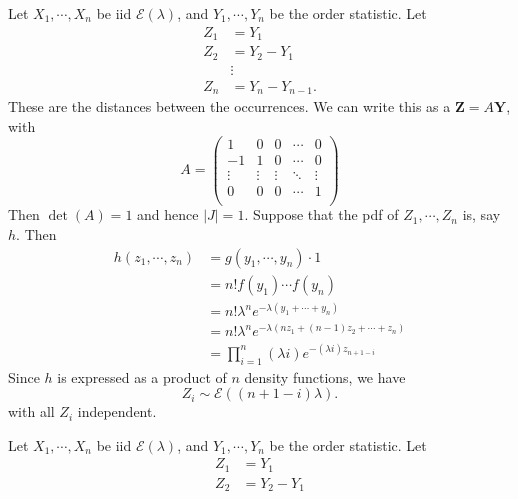 \begin{note}
  \begin{field}
    \begin{eg}
      Let $X_1, \cdots, X_n$ be iid $\mathcal{E}(\lambda)$, and $Y_1, \cdots, Y_n$ be the order statistic. Let
      \begin{align*}
        Z_1 &= Y_1\\
        Z_2 &= Y_2 - Y_1\\
        &\vdots\\
        Z_n &= Y_n - Y_{n - 1}.
      \end{align*}
      These are the distances between the occurrences. We can write this as a $\mathbf{Z} = A\mathbf{Y}$, with
      \[
        A =
        \begin{pmatrix}
          1 & 0 & 0 & \cdots& 0\\
          -1 & 1 & 0 & \cdots & 0\\
          \vdots & \vdots & \vdots & \ddots & \vdots\\
          0 & 0 & 0 & \cdots & 1\\
        \end{pmatrix}
      \]
      Then $\det (A) = 1$ and hence $|J| = 1$. Suppose that the pdf of $Z_1, \cdots, Z_n$ is, say $h$. Then
      \begin{align*}
        h(z_1, \cdots, z_n) &= g(y_1, \cdots, y_n)\cdot 1\\
        &= n!f(y_1) \cdots f(y_n)\\
        &= n!\lambda^n e^{-\lambda (y_1 + \cdots + y_n)}\\
        &= n!\lambda^n e^{-\lambda (nz_1 + (n - 1)z_2 + \cdots + z_n)}\\
        &= \prod_{i = 1}^n (\lambda i)e^{-(\lambda i)z_{n + 1 - i}}
      \end{align*}
      Since $h$ is expressed as a product of $n$ density functions, we have
      \[
        Z_i \sim \mathcal{E}((n + 1 - i)\lambda).
      \]
      with all $Z_i$ independent.
    \end{eg}
  \end{field}
  \begin{field}
    \begin{eg}
      Let $X_1, \cdots, X_n$ be iid $\mathcal{E}(\lambda)$, and $Y_1, \cdots, Y_n$ be the order statistic. Let
      \begin{align*}
        Z_1 &= Y_1\\
        Z_2 &= Y_2 - Y_1\\

\end{align*}
\end{eg}
\end{field}
\end{note}
